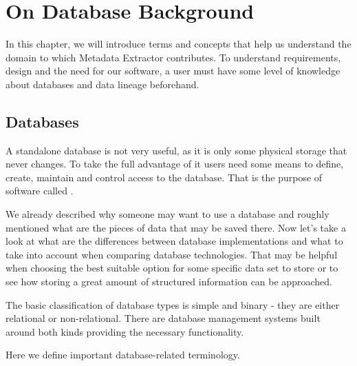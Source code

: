 \chapter{On Database Background}
\label{on_database_background}

In this chapter, we will introduce terms and concepts that help us understand the domain to which Metadata Extractor contributes. To understand requirements, design and the need for our software, a user must have some level of knowledge about databases and data lineage beforehand.

\section{Databases}

A standalone database is not very useful, as it is only some physical storage that never changes. To take the full advantage of it users need some means to define, create, maintain and control access to the database. That is the purpose of software called .

We already described why someone may want to use a database and roughly mentioned what are the pieces of data that may be saved there. 
Now let's take a look at what are the differences between database implementations and what to take into account when comparing database technologies.
That may be helpful when choosing the best suitable option for some specific data set to store or to see how storing a great amount of structured information can be approached.

The basic classification of database types is simple and binary - they are either relational or non-relational. There are database management systems built around both kinds providing the necessary functionality.

Here we define important database-related terminology.

